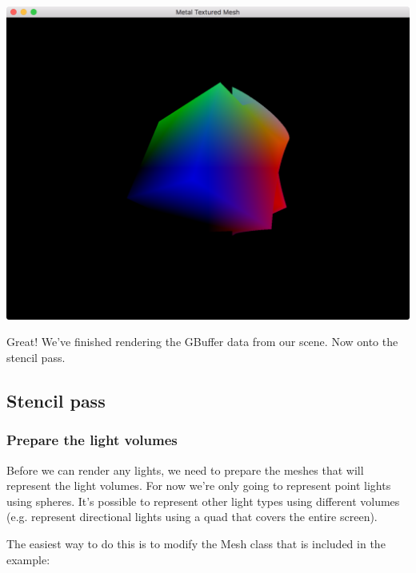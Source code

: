 \documentclass[11pt]{article}
\begin{document}
\begin{center}
\includegraphics[width=.9\linewidth]{../img/posts/implementing-deferred-shading-in-metal/position.png}
\end{center}

Great! We've finished rendering the GBuffer data from our scene. Now onto the stencil pass.

\subsection*{Stencil pass}
\label{sec:org901aa5e}
\subsubsection*{Prepare the light volumes}
\label{sec:org01af324}

Before we can render any lights, we need to prepare the meshes that will
represent the light volumes. For now we're only going to represent point lights
using spheres. It's possible to represent other light types using different
volumes (e.g. represent directional lights using a quad that covers the entire
screen).

The easiest way to do this is to modify the Mesh class that is included in the
example:
\end{document}
